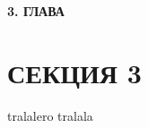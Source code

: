 \newpage
\begin{center}
  \textbf{\large 3. ГЛАВА}
\end{center}


\section{СЕКЦИЯ 3}
tralalero tralala
